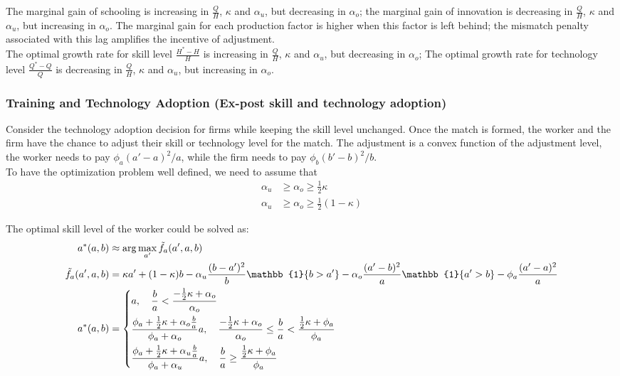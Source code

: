 \documentclass{article}
\newcommand{\1}{\mathbb{1}}
\begin{document}
The marginal gain of schooling is increasing in $\frac{Q}{H}$, $\kappa$ and $\alpha_u$, but decreasing in $\alpha_o$; the marginal gain of innovation is decreasing in $\frac{Q}{H}$, $\kappa$ and $\alpha_u$, but increasing in $\alpha_o$. The marginal gain for each production factor is higher when this factor is left behind; the mismatch penalty associated with this lag amplifies the incentive of adjustment.  \\

The optimal growth rate for skill level $\frac{H^*-H}{H}$ is increasing in $\frac{Q}{H}$, $\kappa$ and $\alpha_u$, but decreasing in $\alpha_o$; The optimal growth rate for technology level $\frac{Q^*-Q}{Q}$  is decreasing in $\frac{Q}{H}$, $\kappa$ and $\alpha_u$, but increasing in $\alpha_o$. \\

\subsubsection*{Training and Technology Adoption (Ex-post skill and technology adoption)} 
Consider the technology adoption decision for firms while keeping the skill level unchanged. Once the match is formed, the worker and the firm have the chance to adjust their skill or technology level for the match. The adjustment is a convex function of the adjustment level, the worker needs to pay $\phi_a(a'-a)^2/a$, while the firm needs to pay $\phi_b(b'-b)^2/b$. \\

To have the optimization problem well defined, we need to assume that 
\begin{align*}
\alpha_u &\geq \alpha_o \geq \frac{1}{2}\kappa \\
\alpha_u &\geq \alpha_o \geq \frac{1}{2}(1-\kappa)
\end{align*}

The optimal skill level of the worker could be solved as: 
\begin{align*}
a^*(a,b) &\approx \arg\max_{a'} \tilde{f}_a(a',a,b) \\
\tilde{f_a}(a',a,b)&=\kappa a'+(1-\kappa) b-\alpha_u\frac{(b-a')^2}{b}\1\{b>a'\}-\alpha_o\frac{(a'-b)^2}{a}\1\{a'>b\}-\phi_a\frac{(a'-a)^2}{a} \\
a^*(a,b) 
&= \begin{dcases}
a, \quad \frac{b}{a}<\frac{-\frac{1}{2}\kappa+\alpha_o}{\alpha_o} \\
\frac{\phi_a+\frac{1}{2}\kappa+\alpha_o\frac{b}{a}}{\phi_a+\alpha_o}a, \quad \frac{-\frac{1}{2}\kappa+\alpha_o}{\alpha_o}\leq\frac{b}{a}<\frac{\frac{1}{2}\kappa+\phi_a}{\phi_a} \\
\frac{\phi_a+\frac{1}{2}\kappa+\alpha_u\frac{b}{a}}{\phi_a+\alpha_u}a, \quad \frac{b}{a}\geq\frac{\frac{1}{2}\kappa+\phi_a}{\phi_a}
\end{dcases} 
\end{align*}
\end{document}
